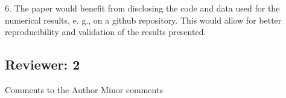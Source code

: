 6. The paper would benefit from disclosing the code and data used for the numerical results, e. g., on a github repository. This would allow for better reproducibility and validation of the results presented.



\subsection{Reviewer: 2}

Comments to the Author
Minor comments

   
   
   




